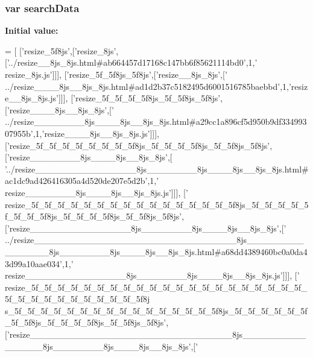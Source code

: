 \subsubsection[{search\+Data}]{\setlength{\rightskip}{0pt plus 5cm}var search\+Data}\label{variables__10_8js_ad01a7523f103d6242ef9b0451861231e}
{\bfseries Initial value\+:}
\begin{DoxyCode}
=
[
  [\textcolor{stringliteral}{'resize\_5f8js'},[\textcolor{stringliteral}{'resize\_8js'},[\textcolor{stringliteral}{'../resize\_\_8js\_8js.html#ab664457d17168c147bb6f85621114bd0'},1,\textcolor{stringliteral}{'
      resize\_8js.js'}]]],
  [\textcolor{stringliteral}{'resize\_5f\_5f8js\_5f8js'},[\textcolor{stringliteral}{'resize\_\_8js\_8js'},[\textcolor{stringliteral}{'
      ../resize\_\_\_\_8js\_\_8js\_8js.html#ad1d2b37c5182495d6001516785baebbd'},1,\textcolor{stringliteral}{'resize\_\_8js\_8js.js'}]]],
  [\textcolor{stringliteral}{'resize\_5f\_5f\_5f\_5f8js\_5f\_5f8js\_5f8js'},[\textcolor{stringliteral}{'resize\_\_\_\_8js\_\_8js\_8js'},[\textcolor{stringliteral}{'
      ../resize\_\_\_\_\_\_\_\_8js\_\_\_\_8js\_\_8js\_8js.html#a29cc1a896cf5d950b9df33499307955b'},1,\textcolor{stringliteral}{'resize\_\_\_\_8js\_\_8js\_8js.js'}]]],
  [\textcolor{stringliteral}{'resize\_5f\_5f\_5f\_5f\_5f\_5f\_5f\_5f8js\_5f\_5f\_5f\_5f8js\_5f\_5f8js\_5f8js'},[\textcolor{stringliteral}{'resize\_\_\_\_\_\_\_\_8js\_\_\_\_8js\_\_8js\_8js'},[\textcolor{stringliteral}{
      '../resize\_\_\_\_\_\_\_\_\_\_\_\_\_\_\_\_8js\_\_\_\_\_\_\_\_8js\_\_\_\_8js\_\_8js\_8js.html#ac1dc9ad426416305a4d520de207e5d2b'},1,\textcolor{stringliteral}{'
      resize\_\_\_\_\_\_\_\_8js\_\_\_\_8js\_\_8js\_8js.js'}]]],
  [\textcolor{stringliteral}{'
      resize\_5f\_5f\_5f\_5f\_5f\_5f\_5f\_5f\_5f\_5f\_5f\_5f\_5f\_5f\_5f\_5f8js\_5f\_5f\_5f\_5f\_5f\_5f\_5f\_5f8js\_5f\_5f\_5f\_5f8js\_5f\_5f8js\_5f8js'},[\textcolor{stringliteral}{'resize\_\_\_\_\_\_\_\_\_\_\_\_\_\_\_\_8js\_\_\_\_\_\_\_\_8js\_\_\_\_8js\_\_8js\_8js'},[\textcolor{stringliteral}{'
      ../resize\_\_\_\_\_\_\_\_\_\_\_\_\_\_\_\_\_\_\_\_\_\_\_\_\_\_\_\_\_\_\_\_8js\_\_\_\_\_\_\_\_\_\_\_\_\_\_\_\_8js\_\_\_\_\_\_\_\_8js\_\_\_\_8js\_\_8js\_8js.html#a68dd4389460bc0a0da43d99a10aae034'},1,\textcolor{stringliteral}{'
      resize\_\_\_\_\_\_\_\_\_\_\_\_\_\_\_\_8js\_\_\_\_\_\_\_\_8js\_\_\_\_8js\_\_8js\_8js.js'}]]],
  [\textcolor{stringliteral}{'
      resize\_5f\_5f\_5f\_5f\_5f\_5f\_5f\_5f\_5f\_5f\_5f\_5f\_5f\_5f\_5f\_5f\_5f\_5f\_5f\_5f\_5f\_5f\_5f\_5f\_5f\_5f\_5f\_5f\_5f\_5f\_5f\_5f8j
      s\_5f\_5f\_5f\_5f\_5f\_5f\_5f\_5f\_5f\_5f\_5f\_5f\_5f\_5f\_5f\_5f8js\_5f\_5f\_5f\_5f\_5f\_5f\_5f\_5f8js\_5f\_5f\_5f\_5f8js\_5f\_5f8js\_5f8js'},[\textcolor{stringliteral}{'resize\_\_\_\_\_\_\_\_\_\_\_\_\_\_\_\_\_\_\_\_\_\_\_\_\_\_\_\_\_\_\_\_8js\_\_\_\_\_\_\_\_\_\_\_\_\_\_\_\_8js\_\_\_\_\_\_\_\_8js\_\_\_\_8js\_\_8js\_8js'},[\textcolor{stringliteral}{'
}
\end{DoxyCode}
